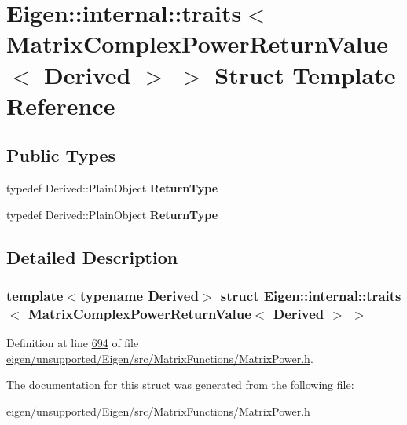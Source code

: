 \hypertarget{struct_eigen_1_1internal_1_1traits_3_01_matrix_complex_power_return_value_3_01_derived_01_4_01_4}{}\section{Eigen\+:\+:internal\+:\+:traits$<$ Matrix\+Complex\+Power\+Return\+Value$<$ Derived $>$ $>$ Struct Template Reference}
\label{struct_eigen_1_1internal_1_1traits_3_01_matrix_complex_power_return_value_3_01_derived_01_4_01_4}
\subsection*{Public Types}
\begin{DoxyCompactItemize}
\item 
\mbox{\label{struct_eigen_1_1internal_1_1traits_3_01_matrix_complex_power_return_value_3_01_derived_01_4_01_4_ad485c012e2401d46cb1d91bed0ac4590}} 
typedef Derived\+::\+Plain\+Object {\bfseries Return\+Type}
\item 
\mbox{\label{struct_eigen_1_1internal_1_1traits_3_01_matrix_complex_power_return_value_3_01_derived_01_4_01_4_ad485c012e2401d46cb1d91bed0ac4590}} 
typedef Derived\+::\+Plain\+Object {\bfseries Return\+Type}
\end{DoxyCompactItemize}


\subsection{Detailed Description}
\subsubsection*{template$<$typename Derived$>$\newline
struct Eigen\+::internal\+::traits$<$ Matrix\+Complex\+Power\+Return\+Value$<$ Derived $>$ $>$}



Definition at line \hyperlink{eigen_2unsupported_2_eigen_2src_2_matrix_functions_2_matrix_power_8h_source_l00694}{694} of file \hyperlink{eigen_2unsupported_2_eigen_2src_2_matrix_functions_2_matrix_power_8h_source}{eigen/unsupported/\+Eigen/src/\+Matrix\+Functions/\+Matrix\+Power.\+h}.



The documentation for this struct was generated from the following file\+:\begin{DoxyCompactItemize}
\item 
eigen/unsupported/\+Eigen/src/\+Matrix\+Functions/\+Matrix\+Power.\+h\end{DoxyCompactItemize}
